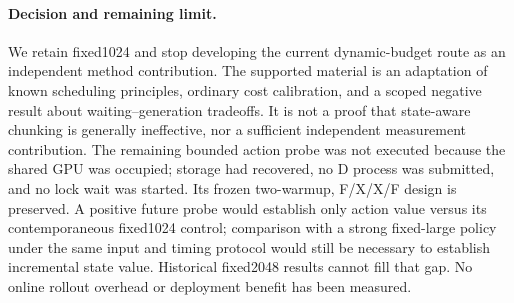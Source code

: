 \paragraph{Decision and remaining limit.}
We retain fixed1024 and stop developing the current dynamic-budget route as
an independent method contribution. The supported material is an adaptation
of known scheduling principles, ordinary cost calibration, and a scoped
negative result about waiting--generation tradeoffs. It is not a proof that
state-aware chunking is generally ineffective, nor a sufficient independent
measurement contribution. The remaining bounded action probe was not executed
because the shared GPU was occupied; storage had recovered, no D process was
submitted, and no lock wait was started. Its frozen two-warmup, F/X/X/F design
is preserved. A positive future probe would establish only action value versus
its contemporaneous fixed1024 control; comparison with a strong fixed-large
policy under the same input and timing protocol would still be necessary to
establish incremental state value. Historical fixed2048 results cannot fill
that gap. No online rollout overhead or deployment benefit has been measured.
